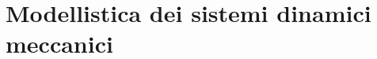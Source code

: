 \documentclass[../main.tex]{subfiles}
\begin{document}
\clearpage
\thispagestyle{empty}

\vspace*{7cm}
\section{Modellistica dei sistemi dinamici meccanici}
\vspace*{1.5cm}
\end{document}
